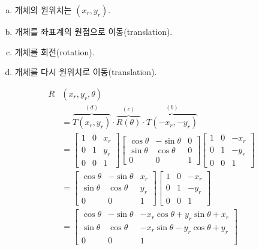 \begin{enumerate}[(a)]
  \item 개체의 원위치는 $(x_r, y_r)$.
  \item 개체를 좌표계의 원점으로 이동(translation).
  \item 개체를 회전(rotation).
  \item 개체를 다시 원위치로 이동(translation).
\end{enumerate}
$$
\begin{aligned}
  R&(x_r, y_r, \theta) \\
  &= \overbrace{T(x_r, y_r)}^{(d)} \cdot \overbrace{R(\theta)}^{(c)} \cdot \overbrace{T(-x_r, -y_r)}^{(b)} \\
  &=
  \begin{bmatrix}
    1 & 0 & x_r \\
    0 & 1 & y_r \\
    0 & 0 & 1
  \end{bmatrix}
  \begin{bmatrix}
    \cos{\theta} & -\sin{\theta} & 0 \\
    \sin{\theta} & \cos{\theta} & 0 \\
    0 & 0 & 1
  \end{bmatrix}
  \begin{bmatrix}
    1 & 0 & -x_r \\
    0 & 1 & -y_r \\
    0 & 0 & 1
  \end{bmatrix} \\
  &=
  \begin{bmatrix}
    \cos{\theta} & -\sin{\theta} & x_r \\
    \sin{\theta} & \cos{\theta} & y_r \\
    0 & 0 & 1
  \end{bmatrix}
  \begin{bmatrix}
    1 & 0 & -x_r \\
    0 & 1 & -y_r \\
    0 & 0 & 1
  \end{bmatrix} \\
  &=
  \begin{bmatrix}
    \cos{\theta} & -\sin{\theta} & -x_r\cos{\theta} + y_r\sin{\theta} + x_r \\
    \sin{\theta} & \cos{\theta} & -x_r\sin{\theta} - y_r\cos{\theta} + y_r \\
    0 & 0 & 1
  \end{bmatrix}
\end{aligned}
$$
